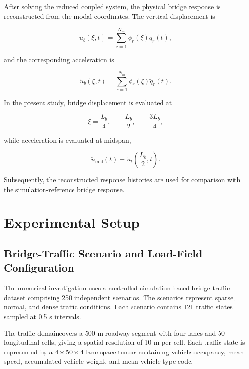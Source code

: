 \documentclass[journal]{IEEEtran}
\begin{document}
After solving the reduced coupled system, the physical bridge
response is reconstructed from the modal coordinates. The vertical displacement
is

\begin{equation}
u_b(\xi,t)
=
\sum_{r=1}^{N_m}
\phi_r(\xi)q_r(t),
\end{equation}

and the corresponding acceleration is

\begin{equation}
\ddot{u}_b(\xi,t)
=
\sum_{r=1}^{N_m}
\phi_r(\xi)\ddot{q}_r(t).
\end{equation}

In the present study, bridge displacement is evaluated at

\begin{equation}
\xi
=
\frac{L_b}{4},
\qquad
\frac{L_b}{2},
\qquad
\frac{3L_b}{4},
\end{equation}

while acceleration is evaluated at midspan,

\begin{equation}
\ddot{u}_{\mathrm{mid}}(t)
=
\ddot{u}_b
\left(
\frac{L_b}{2},t
\right).
\end{equation}

Subsequently, the reconstructed response histories are used for comparison with the simulation-reference bridge response.




\section{Experimental Setup}

\subsection{Bridge-Traffic Scenario and Load-Field Configuration}

The numerical
investigation uses a controlled simulation-based bridge-traffic dataset
comprising 250 independent scenarios. The scenarios represent sparse, normal,
and dense traffic conditions. Each scenario contains 121 traffic states sampled
at 0.5 s intervals.

The traffic domaincovers a 500 m roadway segment with four lanes and 50 longitudinal cells,
giving a spatial resolution of 10 m per cell. Each traffic state is represented
by a $4\times50\times4$ lane-space tensor
containing vehicle occupancy, mean speed, accumulated vehicle weight, and mean
vehicle-type code.
\end{document}
